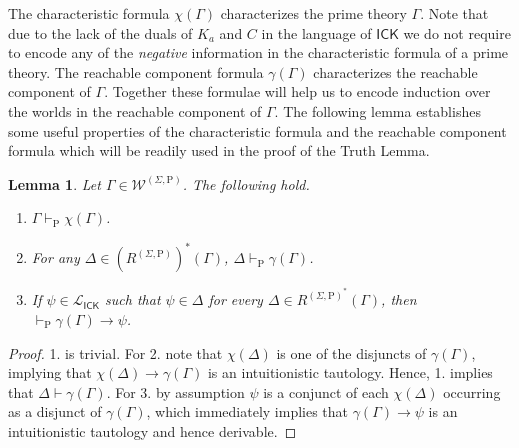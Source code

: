 \documentclass{myifcolog}
\newcommand\C {C}
\newcommand{\K}{K}
\newcommand{\agi}{a}
\newcommand{\ICK}{\mathsf{ICK}}
\newcommand{\LICK}{\mathcal{L}_{\ICK}}
\newcommand{\Rel}{\mathrel{R}}
\newcommand{\W}{\mathcal{W}}
\newcommand{\hickp}{\mathrm{P}}
\newtheorem{lemma}[theorem]{Lemma}
\numberwithin{theorem}{section}
\begin{document}

The characteristic formula $\chi(\Gamma)$ characterizes the prime theory $\Gamma$. Note that due to the lack of the duals of $\K_\agi$ and $\C$ in the language of $\ICK$ we do not require to encode any of the \emph{negative} information in the characteristic formula of a prime theory. The reachable component formula $\gamma(\Gamma)$ characterizes the reachable component of $\Gamma$. Together these formulae will help us to encode induction over the worlds in the reachable component of $\Gamma$. The following lemma establishes some useful properties of the characteristic formula and the reachable component formula which will be readily used in the proof of the Truth Lemma. 

\begin{lemma}\label{l: properties characteristic formula IM}
    Let $\Gamma \in \W^{(\Sigma, \hickp)}$.  The following hold.
    \begin{enumerate}
        \item $\Gamma \vdash_\mathrm{P} \chi(\Gamma)$.
        \item For any $\Delta \in (R^{(\Sigma,\hickp)})^*(\Gamma)$, $\Delta \vdash_\mathrm{P} \gamma(\Gamma)$.
        \item If $\psi \in \LICK$ such that $\psi \in \Delta$ for every $\Delta \in R^{(\Sigma, \hickp)^*}(\Gamma)$, then $\vdash_\mathrm{P} \gamma(\Gamma) \rightarrow \psi$.
    \end{enumerate}
\end{lemma}
\begin{proof}
    1. is trivial. For 2. note that $\chi(\Delta)$ is one of the disjuncts of $\gamma(\Gamma)$, implying that $\chi(\Delta) \rightarrow \gamma(\Gamma)$ is an intuitionistic tautology. Hence, 1. implies that $\Delta \vdash \gamma(\Gamma)$. For 3. by assumption $\psi$ is a conjunct of each $\chi(\Delta)$ occurring as a disjunct of $\gamma(\Gamma)$, which immediately implies that $\gamma(\Gamma) \rightarrow \psi$ is an intuitionistic tautology and hence derivable.
\end{proof}
\end{document}

